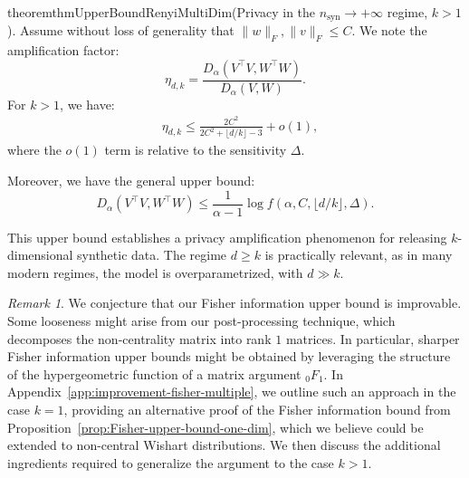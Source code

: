 \documentclass{article}
\theoremstyle{plain}
\theoremstyle{definition}
\theoremstyle{remark}
\newtheorem{remark}[theorem]{Remark}
\begin{document}
\begin{restatable}{theorem}{thmUpperBoundRenyiMultiDim}{\normalfont (Privacy in the $n_{\mathrm{syn}} \to + \infty$ regime, $k>1$).} \label{thm:upper-bound-renyi-multiple-dim}Assume without loss of generality that $\|w\|_F ,\|v\|_F \leq C$. We note the amplification factor:
    \[\textstyle \eta_{d,k} = \frac{D_\alpha(V^\top V,W^\top W)}{D_\alpha(V,W)}.\]
    For $k>1$, we have:
    \begin{align*}
       & \eta_{d,k} \leq  \frac{2C^2}{2C^2 + \lfloor d/k \rfloor - 3}+ o(1),
    \end{align*}
    where the $o(1)$ term is relative to the sensitivity $\Delta$. 
    
    Moreover, we have the general upper bound:
    \[D_\alpha(V^\top V,W^\top W) \leq \frac{1}{\alpha-1}\log f(\alpha,C,\lfloor d/k \rfloor,\Delta).\]
\end{restatable}

This upper bound establishes a privacy amplification phenomenon for releasing $k$-dimensional synthetic data. The regime $d \geq k$ is practically relevant, as in many modern regimes, the model is overparametrized, with $d \gg k$.

\begin{remark}
     
    We conjecture that our Fisher information upper bound is improvable. Some looseness might arise from our post-processing technique, which decomposes the non-centrality matrix into rank $1$ matrices. In particular, sharper Fisher information upper bounds might be obtained by leveraging the structure of the hypergeometric function of a matrix argument ${}_0F_1$. In Appendix~\ref{app:improvement-fisher-multiple}, we outline such an approach in the case $k=1$, providing an alternative proof of the Fisher information bound from Proposition~\ref{prop:Fisher-upper-bound-one-dim}, which we believe could be extended to non-central Wishart distributions. We then discuss the additional ingredients required to generalize the argument to the case $k>1$.
\end{remark}
\end{document}
